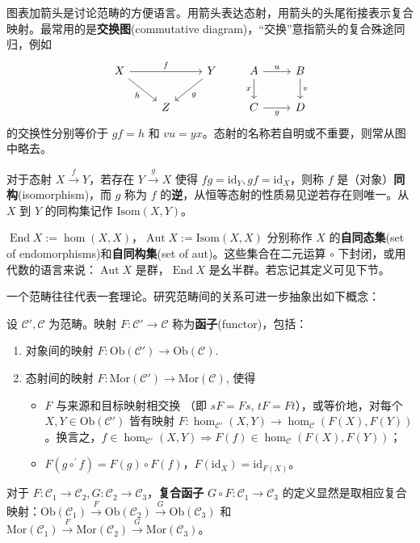 图表加箭头是讨论范畴的方便语言。用箭头表达态射，用箭头的头尾衔接表示复合映射。最常用的是\textbf{交换图}(commutative diagram)，“交换”意指箭头的复合殊途同归，例如
    \[ \begin{tikzcd}
        X \arrow[rr, "f"] \arrow[rd, "h"'] & & Y \arrow[ld, "g"] \\
        & Z &
    \end{tikzcd} \qquad \begin{tikzcd}
        A \arrow[r, "u"] \arrow[d, "x"'] & B \arrow[d, "v"] \\
        C \arrow[r, "y"'] & D
    \end{tikzcd} \]
的交换性分别等价于 $g f = h$ 和 $v u = y x$。态射的名称若自明或不重要，则常从图中略去。

\begin{definition}
    对于态射 $X \xrightarrow{f} Y$，若存在 $Y \xrightarrow{g} X$ 使得 $f g = \mathrm{id}_Y,g f = \mathrm{id}_X$，则称 $f$ 是（对象）\textbf{同构}(isomorphism)，而 $g$ 称为 $f$ 的\textbf{逆}，从恒等态射的性质易见逆若存在则唯一。从 $X$ 到 $Y$ 的同构集记作 $\mathrm{Isom}(X, Y)$。

    $\operatorname{End} X := \hom(X, X)$，$\operatorname{Aut} X := \mathrm{Isom}(X, X)$ 分别称作 $X$ 的\textbf{自同态集}(set of endomorphisms)和\textbf{自同构集}(set of aut)。这些集合在二元运算 $\circ$ 下封闭，或用代数的语言来说：$\operatorname{Aut} X$ 是群，$\operatorname{End} X$ 是幺半群。若忘记其定义可见下节。
\end{definition}


一个范畴往往代表一套理论。研究范畴间的关系可进一步抽象出如下概念：
\begin{definition}
    设 $\mathcal{C}', \mathcal{C}$ 为范畴。映射 $F: \mathcal{C}' \to \mathcal{C}$ 称为\textbf{函子}(functor)，包括：
    \begin{enumerate}
        \item 对象间的映射 $F: \mathrm{Ob}(\mathcal C')\to\mathrm{Ob}(\mathcal C)$.
        \item 态射间的映射 $F: \mathrm{Mor}(\mathcal C')\to \mathrm{Mor}(\mathcal C)$, 使得
            \begin{itemize}
                \item $F$ 与来源和目标映射相交换 （即 $sF=Fs$, $tF=Ft$），或等价地，对每个 $X, Y \in \mathrm{Ob}(\mathcal{C}')$ 皆有映射 $F: \hom_{\mathcal{C}'}(X, Y) \to \hom_{\mathcal{C}}(F(X), F(Y))$。换言之，$f\in \hom_{\mathcal{C}'}(X, Y)\Rightarrow F(f)\in \hom_{\mathcal{C}}(F(X), F(Y))$；
                \item $F(g\circ^{\prime} f) = F(g) \circ F(f)$，$F(\mathrm{id}_X) = \mathrm{id}_{F(X)}$。
            \end{itemize}
    \end{enumerate}
    对于 $F: \mathcal{C}_1 \to \mathcal{C}_2,G: \mathcal{C}_2 \to \mathcal{C}_3$，\textbf{复合函子} $G \circ F: \mathcal{C}_1 \to \mathcal{C}_3$ 的定义显然是取相应复合映射：$\mathrm{Ob}(\mathcal{C}_1) \xrightarrow{F} \mathrm{Ob}(\mathcal{C}_2) \xrightarrow{G} \mathrm{Ob}(\mathcal{C}_3)$ 和 $\mathrm{Mor}(\mathcal{C}_1) \xrightarrow{F} \mathrm{Mor}(\mathcal{C}_2) \xrightarrow{G} \mathrm{Mor}(\mathcal{C}_3)$。
\end{definition}

